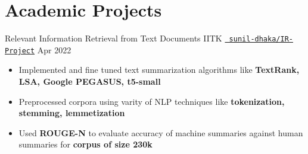\section*{\sc Academic Projects}
\vspace{-2mm}
\hrulefill
\vspace{1mm}

\cventry
{Relevant Information Retrieval from Text Documents}
{IITK}
{\texttt{\href{https://github.com/sunil-dhaka/IR-Project}{\faGithub{} sunil-dhaka/IR-Project}}}
{Apr 2022}
{
  \begin{itemize}
    \item Implemented and fine tuned text summarization algorithms like \textbf{TextRank, LSA, Google PEGASUS, t5-small}
    \item Preprocessed corpora using varity of NLP techniques like \textbf{tokenization, stemming, lemmetization}
  \item Used \textbf{ROUGE-N} to evaluate accuracy of machine summaries against human summaries for \textbf{corpus of size 230k}

\end{itemize}}
